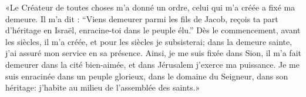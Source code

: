 «Le Créateur de toutes choses m’a donné un ordre,
	celui qui m’a créée a fixé ma demeure.
Il m’a dit : “Viens demeurer parmi les fils de Jacob,
	reçois ta part d’héritage en Israël, enracine-toi dans le peuple élu.”
Dès le commencement, avant les siècles, il m’a créée,
	et pour les siècles je subsisterai;
	dans la demeure sainte, j’ai assuré mon service en sa présence.
Ainsi, je me suis fixée dans Sion,
	il m’a fait demeurer dans la cité bien-aimée,
	et dans Jérusalem j’exerce ma puissance.
Je me suis enracinée dans un peuple glorieux,
	dans le domaine du Seigneur, dans son héritage:
	j’habite au milieu de l’assemblée des saints.»
